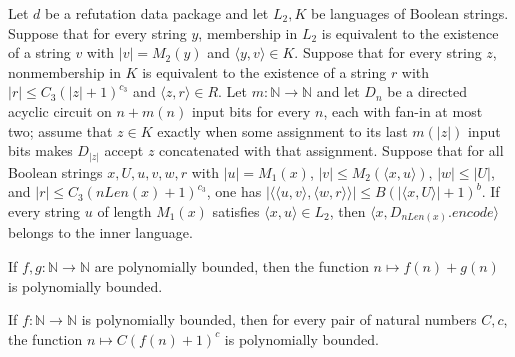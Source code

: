 \begin{theorem}
\label{Complexity.Yap.complete}
\leanok
{}
Let $d$ be a refutation data package and let $L_2,K$ be languages of Boolean strings.
Suppose that for every string $y$, membership in $L_2$ is equivalent to the existence of
a string $v$ with $|v|=M_2(y)$ and $\langle y,v\rangle\in K$. Suppose that for every
string $z$, nonmembership in $K$ is equivalent to the existence of a string $r$ with
$|r|\le C_3(|z|+1)^{c_3}$ and $\langle z,r\rangle\in R$. Let
$m\colon\mathbb{N}\to\mathbb{N}$ and let $D_n$ be a directed acyclic circuit on $n+m(n)$
input bits for every $n$, each with fan-in at most two; assume that $z\in K$ exactly
when some assignment to its last $m(|z|)$ input bits makes $D_{|z|}$ accept $z$
concatenated with that assignment. Suppose that for all Boolean strings $x,U,u,v,w,r$
with $|u|=M_1(x)$, $|v|\le M_2(\langle x,u\rangle)$, $|w|\le|U|$, and $|r|\le
C_3(nLen(x)+1)^{c_3}$, one has $|\langle\langle u,v\rangle,\langle w,r\rangle\rangle|\le
B(|\langle x,U\rangle|+1)^b$. If every string $u$ of length $M_1(x)$ satisfies $\langle
x,u\rangle\in L_2$, then $\langle x,D_{nLen(x)}.encode\rangle$ belongs to the inner
language.
\end{theorem}

\begin{theorem}
\label{Complexity.Yap.polyBound_add}
\leanok
{}
If $f,g:\mathbb N\to\mathbb N$ are polynomially bounded, then the function $n\mapsto
f(n)+g(n)$ is polynomially bounded.
\end{theorem}

\begin{theorem}
\label{Complexity.Yap.polyBound_comp}
\leanok
{}
If $f : \mathbb{N} \to \mathbb{N}$ is polynomially bounded, then for every pair of
natural numbers $C,c$, the function $n \mapsto C(f(n)+1)^c$ is polynomially bounded.
\end{theorem}

